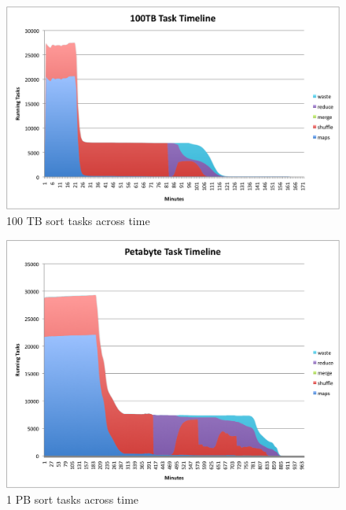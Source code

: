 \documentclass{article}
\begin{document}
\begin{figure}[!p]
\includegraphics[width=4.5in]{100TBTaskTime.png}
\caption{100 TB sort tasks across time}\label{100TbTimeline}
\end{figure} 

\begin{figure}[!p]
\includegraphics[width=4.5in]{1PBTaskTime.png}
\caption{1 PB sort tasks across time}\label{1PbTimeline}
\end{figure} 
\end{document}
